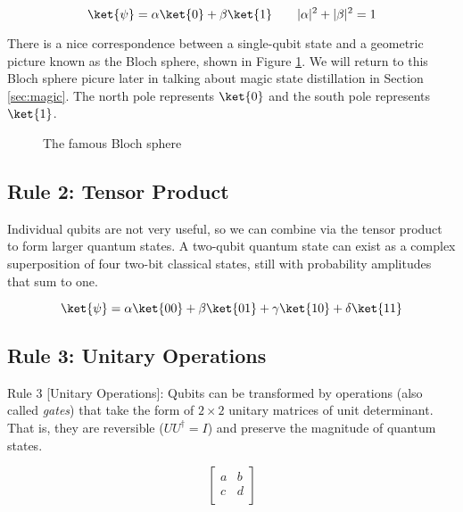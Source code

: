 \begin{equation}
\ket{\psi} = \alpha \ket{0} + \beta \ket{1} \qquad
|\alpha|^2 + |\beta|^2 = 1
\end{equation}

There is a nice correspondence between a single-qubit state and a geometric
picture known as the Bloch sphere, shown in Figure \ref{fig:bloch-sphere}.
We will return to this Bloch sphere picure later in talking about
magic state distillation in Section \ref{sec:magic}.
The north pole represents $\ket{0}$ and the south pole represents $\ket{1}$.

\begin{figure}
\label{fig:bloch-sphere}
\caption{The famous Bloch sphere}
\end{figure}

\subsection{Rule 2: Tensor Product}

Individual qubits are not very useful, so we
can combine via the tensor product to form larger quantum
states. A two-qubit quantum state can exist as a complex superposition of
four two-bit classical states, still with probability amplitudes that sum to
one.

\begin{equation}
\ket{\psi} = \alpha \ket{00} + \beta \ket{01} + \gamma \ket{10} + \delta \ket{11}
\end{equation}

\subsection{Rule 3: Unitary Operations}

\begin{definition}
Rule 3 [Unitary Operations]:
Qubits can be transformed by operations (also called \emph{gates})
that take the form of $2\times 2$ unitary matrices of unit determinant.
That is, they are reversible ($UU^\dagger = I$) and preserve the magnitude
of quantum states.
\end{definition}

\begin{equation}
\left[ \begin{array}{cc}
a & b \\
c & d \\
\end{array} \right]
\end{equation}

